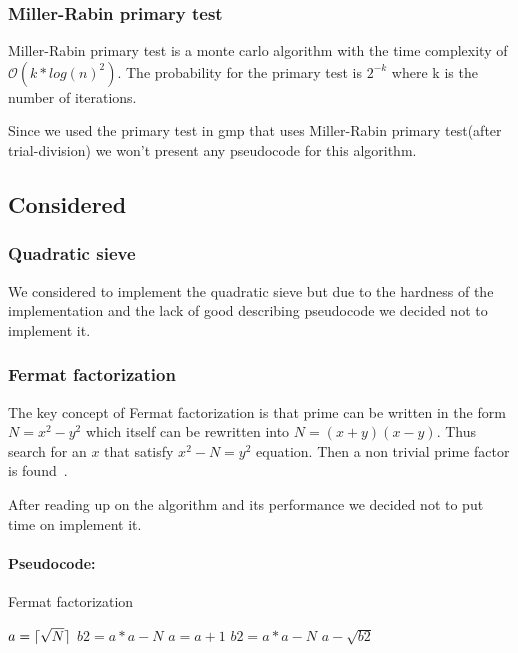 \subsubsection{Miller-Rabin primary test}

Miller-Rabin primary test is a monte carlo algorithm with the time complexity of $\mathcal{O}(k*log(n)^2)$. The
probability for the primary test is $2^{-k}$ where k is the number of iterations.

Since we used the primary test in gmp that uses Miller-Rabin primary test(after trial-division) we won't present any pseudocode for this algorithm.

\subsection{Considered}

\subsubsection{Quadratic sieve}

We considered to implement the quadratic sieve but due to the hardness of the implementation and the lack of good describing pseudocode we decided not to implement it.

\subsubsection{Fermat factorization}

The key concept of Fermat factorization is that prime can be written in the form $N = x^2 - y^2$ which itself can be rewritten into $N = (x+y)(x-y)$. Thus search for an $x$ that satisfy $x^2 - N = y^2$ equation. Then a non trivial prime factor is found~\cite{fermat}.   

After reading up on the algorithm and its performance we decided not to put time on implement it.

\paragraph{Pseudocode:}

\textcolor{white}{ }

\begin{algorithm}[H]
\caption{Fermat factorization}
\begin{algorithmic}
	\State $a = \lceil\sqrt{N}\rceil$
	\State $b2 = a*a - N$
		\State $a = a + 1$
		\State $b2 = a*a - N$
	\EndWhile	
	\State \Return $a - \sqrt{b2}$
\EndFunction
\end{algorithmic}
\end{algorithm}
